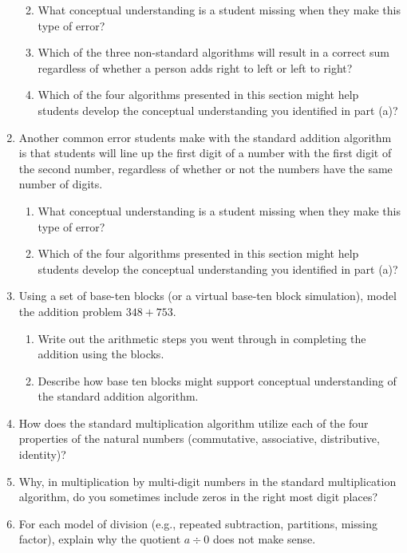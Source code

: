\documentclass[
]{book}
\providecommand{\tightlist}{%
  \setlength{\itemsep}{0pt}\setlength{\parskip}{0pt}}
\theoremstyle{definition}
\theoremstyle{definition}
\theoremstyle{definition}
\theoremstyle{definition}
\theoremstyle{remark}
\begin{document}
\begin{enumerate}
  \begin{enumerate}
  \def\labelenumii{\alph{enumii}.}
  \tightlist
  \item
    What conceptual understanding is a student missing when they make this type of error?
  \item
    Which of the three non-standard algorithms will result in a correct sum regardless of whether a person adds right to left or left to right?
  \item
    Which of the four algorithms presented in this section might help students develop the conceptual understanding you identified in part (a)?
  \end{enumerate}
\item
  Another common error students make with the standard addition algorithm is that students will line up the first digit of a number with the first digit of the second number, regardless of whether or not the numbers have the same number of digits.

  \begin{enumerate}
  \def\labelenumii{\alph{enumii}.}
  \tightlist
  \item
    What conceptual understanding is a student missing when they make this type of error?
  \item
    Which of the four algorithms presented in this section might help students develop the conceptual understanding you identified in part (a)?
  \end{enumerate}
\item
  Using a set of base-ten blocks (or a virtual base-ten block simulation), model the addition problem \(348+753\).

  \begin{enumerate}
  \def\labelenumii{\alph{enumii}.}
  \tightlist
  \item
    Write out the arithmetic steps you went through in completing the addition using the blocks.
  \item
    Describe how base ten blocks might support conceptual understanding of the standard addition algorithm.
  \end{enumerate}
\item
  How does the standard multiplication algorithm utilize each of the four properties of the natural numbers (commutative, associative, distributive, identity)?
\item
  Why, in multiplication by multi-digit numbers in the standard multiplication algorithm, do you sometimes include zeros in the right most digit places?
\item
  For each model of division (e.g., repeated subtraction, partitions, missing factor), explain why the quotient \(a\div 0\) does not make sense.
\end{enumerate}
\end{document}
